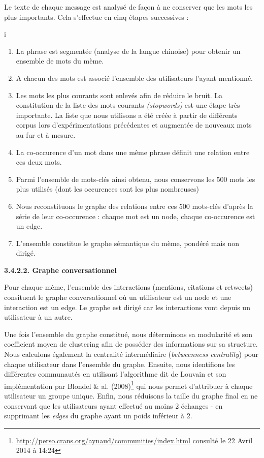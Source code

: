 Le texte de chaque message est analys\'e de fa\c{c}on \`a ne conserver
que les mots les plus importants. Cela s{\textquoteright}effectue en
cinq \'etapes successives : 

i
\begin{enumerate}
\item La phrase est segment\'ee (analyse de la langue chinoise) pour
obtenir un ensemble de mots du m\`eme.
\item A chacun des mots est associ\'e l{\textquoteright}ensemble des
utilisateurs l{\textquoteright}ayant mentionn\'e.
\item Les mots les plus courants sont enlev\'es afin de r\'eduire le
bruit. La constitution de la liste des mots courants
\textit{(stopwords) }est une \'etape tr\`es importante. La liste que
nous utilisons a \'et\'e cr\'e\'ee \`a partir de diff\'erents corpus
lors d{\textquoteright}exp\'erimentations pr\'ec\'edentes et
augment\'ee de nouveaux mots au fur et \`a mesure.
\item La co-occurence d{\textquoteright}un mot dans une m\^eme phrase
d\'efinit une relation entre ces deux mots.
\item Parmi l{\textquoteright}ensemble de mots-cl\'es ainsi obtenu, nous
conservons les 500 mots les plus utilis\'es (dont les occurences sont
les plus nombreuses) 
\item Nous reconstituons le graphe des relations entre ces 500
mots-cl\'es d{\textquoteright}apr\`es la s\'erie de leur co-occurence :
chaque mot est un node, chaque co-occurence est un edge.
\item L{\textquoteright}ensemble constitue le graphe s\'emantique du
m\`eme, pond\'er\'e mais non dirig\'e.
\end{enumerate}
\textbf{3.4.2.2. Graphe conversationnel}

Pour chaque m\`eme, l{\textquoteright}ensemble des interactions
(mentions, citations et retweets) consituent le graphe conversationnel
o\`u un utilisateur est un node et une interaction est un edge. Le
graphe est dirig\'e car les interactions vont depuis un utilisateur \`a
un autre. 

Une fois l{\textquoteright}ensemble du graphe constitu\'e, nous
d\'eterminons sa modularit\'e et son coefficient moyen de clustering
afin de poss\'eder des informations sur sa structure. Nous calculons
\'egalement la centralit\'e interm\'ediaire (\textit{betweenness
centrality}) pour chaque utilisateur dans l{\textquoteright}ensemble du
graphe. Ensuite, nous identifions les diff\'erentes communaut\'es en
utilisant l{\textquoteright}algorithme dit de Louvain et son
impl\'ementation par Blondel \& al. (2008)\footnote{
\url{http://perso.crans.org/aynaud/communities/index.html} consult\'e
le 22 Avril 2014 \`a 14:24} qui nous permet d{\textquoteright}attribuer
\`a chaque utilisateur un groupe unique. Enfin, nous r\'eduisons la
taille du graphe final en ne conservant que les utilisateurs ayant
effectu\'e au moins 2 \'echanges - en supprimant les \textit{edges} du
graphe ayant un poids inf\'erieur \`a 2.

